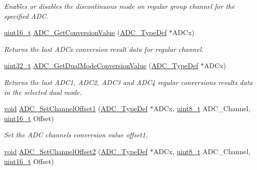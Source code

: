 \begin{DoxyCompactItemize}
\begin{DoxyCompactList}\small\item\em Enables or disables the discontinuous mode on regular group channel for the specified A\-D\-C. \end{DoxyCompactList}\item 
\hyperlink{stdint_8h_a273cf69d639a59973b6019625df33e30}{uint16\-\_\-t} \hyperlink{group___a_d_c___group4_gaaf74221c285ec5dab5e66baf7bec6bd3}{A\-D\-C\-\_\-\-Get\-Conversion\-Value} (\hyperlink{struct_a_d_c___type_def}{A\-D\-C\-\_\-\-Type\-Def} $\ast$A\-D\-Cx)
\begin{DoxyCompactList}\small\item\em Returns the last A\-D\-Cx conversion result data for regular channel. \end{DoxyCompactList}\item 
\hyperlink{stdint_8h_a435d1572bf3f880d55459d9805097f62}{uint32\-\_\-t} \hyperlink{group___a_d_c___group4_ga0badb39841510dc098a73be8c6b995e8}{A\-D\-C\-\_\-\-Get\-Dual\-Mode\-Conversion\-Value} (\hyperlink{struct_a_d_c___type_def}{A\-D\-C\-\_\-\-Type\-Def} $\ast$A\-D\-Cx)
\begin{DoxyCompactList}\small\item\em Returns the last A\-D\-C1, A\-D\-C2, A\-D\-C3 and A\-D\-C4 regular conversions results data in the selected dual mode. \end{DoxyCompactList}\item 
\hyperlink{group___n_a_m_e_ga18028b8badbf1ea7e704ccac3c488e82}{void} \hyperlink{group___a_d_c___group4_ga4f20591341283023748a21a60749aeab}{A\-D\-C\-\_\-\-Set\-Channel\-Offset1} (\hyperlink{struct_a_d_c___type_def}{A\-D\-C\-\_\-\-Type\-Def} $\ast$A\-D\-Cx, \hyperlink{stdint_8h_aba7bc1797add20fe3efdf37ced1182c5}{uint8\-\_\-t} A\-D\-C\-\_\-\-Channel, \hyperlink{stdint_8h_a273cf69d639a59973b6019625df33e30}{uint16\-\_\-t} Offset)
\begin{DoxyCompactList}\small\item\em Set the A\-D\-C channels conversion value offset1. \end{DoxyCompactList}\item 
\hyperlink{group___n_a_m_e_ga18028b8badbf1ea7e704ccac3c488e82}{void} \hyperlink{group___a_d_c___group4_gadb4b2f0c8dfd60374fececc11eacff77}{A\-D\-C\-\_\-\-Set\-Channel\-Offset2} (\hyperlink{struct_a_d_c___type_def}{A\-D\-C\-\_\-\-Type\-Def} $\ast$A\-D\-Cx, \hyperlink{stdint_8h_aba7bc1797add20fe3efdf37ced1182c5}{uint8\-\_\-t} A\-D\-C\-\_\-\-Channel, \hyperlink{stdint_8h_a273cf69d639a59973b6019625df33e30}{uint16\-\_\-t} Offset)

\end{DoxyCompactItemize}

